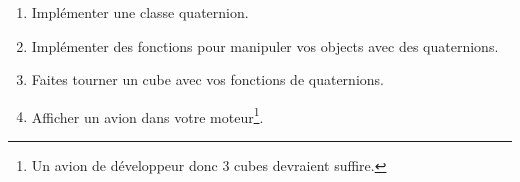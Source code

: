 \documentclass[a4paper,12pt]{article}
\begin{document}
\begin{enumerate}
    \item Implémenter une classe quaternion.
    \item Implémenter des fonctions pour manipuler vos objects avec des quaternions.
    \item Faites tourner un cube avec vos fonctions de quaternions.
    \item Afficher un avion dans votre moteur\footnote{Un avion de développeur donc 3 cubes devraient suffire.}.
\end{enumerate}
\end{document}
